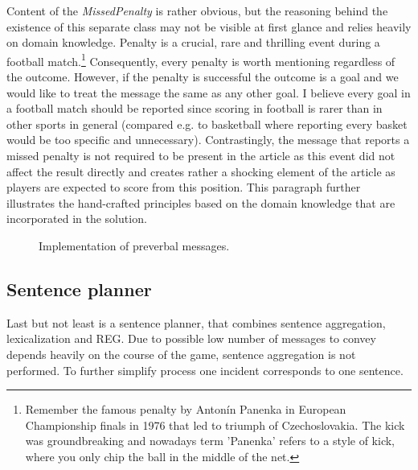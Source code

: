 Content of the \textit{MissedPenalty} is rather obvious, but the reasoning behind the existence of this separate class may not be visible at first glance and relies heavily on domain knowledge. Penalty is a crucial, rare and thrilling event during a football match.\footnote{Remember the famous penalty by Antonín Panenka in European Championship finals in 1976 that led to triumph of Czechoslovakia. The kick was groundbreaking and nowadays term 'Panenka' refers to a style of kick, where you only chip the ball in the middle of the net.} Consequently, every penalty is worth mentioning regardless of the outcome. However, if the penalty is successful the outcome is a goal and we would like to treat the message the same as any other goal. I believe every goal in a football match should be reported since scoring in football is rarer than in other sports in general (compared e.g. to basketball where reporting every basket would be too specific and unnecessary). Contrastingly, the message that reports a missed penalty is not required to be present in the article as this event did not affect the result directly and creates rather a shocking element of the article as players are expected to score from this position. This paragraph further illustrates the hand-crafted principles based on the domain knowledge that are incorporated in the solution.

\begin{figure}[h]
	\caption{Implementation of preverbal messages.}
	\label{fig:message}
\end{figure} 

\subsection{Sentence planner}
Last but not least is a sentence planner, that combines sentence aggregation, lexicalization and REG. Due to possible low number of messages to convey depends heavily on the course of the game, sentence aggregation is not performed. To further simplify process one incident corresponds to one sentence.

